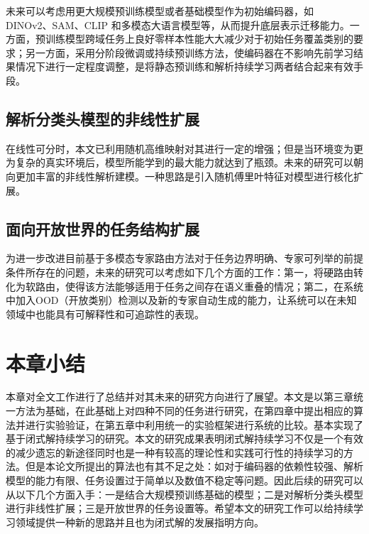 未来可以考虑用更大规模预训练模型或者基础模型作为初始编码器，如 DINOv2、SAM、CLIP 和多模态大语言模型等，从而提升底层表示迁移能力。一方面，预训练模型跨域任务上良好零样本性能大大减少对于初始任务覆盖类别的要求；另一方面，采用分阶段微调或持续预训练方法，使编码器在不影响先前学习结果情况下进行一定程度调整，是将静态预训练和解析持续学习两者结合起来有效手段。

\subsection{解析分类头模型的非线性扩展}

在线性可分时，本文已利用随机高维映射对其进行一定的增强；但是当环境变为更为复杂的真实环境后，模型所能学到的最大能力就达到了瓶颈。未来的研究可以朝向更加丰富的非线性解析建模。一种思路是引入随机傅里叶特征对模型进行核化扩展。

\subsection{面向开放世界的任务结构扩展}

为进一步改进目前基于多模态专家路由方法对于任务边界明确、专家可列举的前提条件所存在的问题，未来的研究可以考虑如下几个方面的工作：第一，将硬路由转化为软路由，使得该方法能够适用于任务之间存在语义重叠的情况；第二，在系统中加入OOD（开放类别）检测以及新的专家自动生成的能力，让系统可以在未知领域中也能具有可解释性和可追踪性的表现。


\section{本章小结}

本章对全文工作进行了总结并对其未来的研究方向进行了展望。本文是以第三章统一方法为基础，在此基础上对四种不同的任务进行研究，在第四章中提出相应的算法并进行实验验证，在第五章中利用统一的实验框架进行系统的比较。基本实现了基于闭式解持续学习的研究。本文的研究成果表明闭式解持续学习不仅是一个有效的减少遗忘的新途径同时也是一种有较高的理论性和实践可行性的持续学习的方法。但是本论文所提出的算法也有其不足之处：如对于编码器的依赖性较强、解析模型的能力有限、任务设置过于简单以及数值不稳定等问题。因此后续的研究可以从以下几个方面入手：一是结合大规模预训练基础的模型；二是对解析分类头模型进行非线性扩展；三是开放世界的任务设置等。希望本文的研究工作可以给持续学习领域提供一种新的思路并且也为闭式解的发展指明方向。